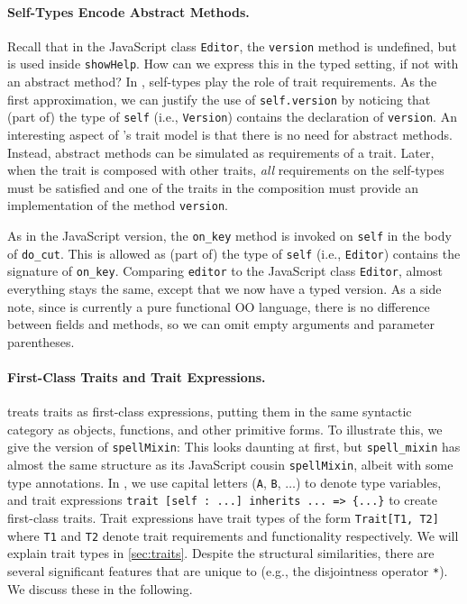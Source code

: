 \paragraph{Self-Types Encode Abstract Methods.}
Recall that in the JavaScript class \lstinline{Editor}, the \lstinline{version}
method is undefined, but is used inside \lstinline{showHelp}. How can we express
this in the typed setting, if not with an abstract method? In \sedel, self-types
play the role of trait requirements. As the first approximation, we
can justify the use of \lstinline{self.version} by noticing that (part of) the
type of \lstinline{self} (i.e., \lstinline{Version}) contains the declaration of
\lstinline{version}. An interesting aspect of \sedel's trait model is that there
is no need for abstract methods. Instead, abstract methods can be simulated as
requirements of a trait. Later, when the trait is composed with other
traits, \emph{all} requirements on the self-types must be
satisfied and one of the traits in the composition must provide an
implementation of the method \lstinline{version}.

As in the JavaScript version, the \lstinline{on_key} method is invoked on
\lstinline{self} in the body of \lstinline{do_cut}. This is allowed as (part of)
the type of \lstinline{self} (i.e., \lstinline{Editor}) contains the signature
of \lstinline{on_key}. Comparing \lstinline{editor} to the JavaScript class
\lstinline{Editor}, almost everything stays the same, except that we now have
a typed version. As a side note, since \sedel is currently a pure functional OO
language, there is no difference between fields and methods, so we can omit
empty arguments and parameter parentheses.

\paragraph{First-Class Traits and Trait Expressions.}

\sedel treats traits as first-class expressions, putting them in the same
syntactic category as objects, functions, and other primitive forms. To
illustrate this, we give the \sedel version of \lstinline{spellMixin}:
This looks daunting at first, but \lstinline{spell_mixin} has almost the same structure as
its JavaScript cousin \lstinline{spellMixin}, albeit with
some type annotations. In \sedel, we use capital letters (\lstinline{A}, \lstinline{B}, $\dots$) to denote type variables, and trait
expressions \lstinline$trait [self : ...] inherits ... => {...}$ to create
first-class traits. Trait expressions have trait
types of the form \lstinline{Trait[T1, T2]} where \lstinline{T1} and \lstinline{T2} denote trait requirements and functionality respectively.
We will explain trait types in \cref{sec:traits}. Despite the structural similarities, there are several significant
features that are unique to \sedel (e.g., the disjointness operator \lstinline{*}).
We discuss these in the following.



